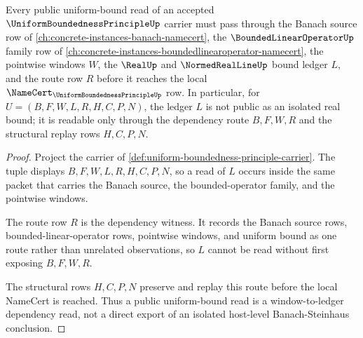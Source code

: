 \begin{theorem}
\label{thm:uniform-boundedness-principle-window-to-ledger}
Every public uniform-bound read of an accepted $\UniformBoundednessPrincipleUp$ carrier must pass through the Banach source row of \autoref{ch:concrete-instances-banach-namecert}, the $\BoundedLinearOperatorUp$ family row of \autoref{ch:concrete-instances-boundedlinearoperator-namecert}, the pointwise windows $W$, the $\RealUp$ and $\NormedRealLineUp$ bound ledger $L$, and the route row $R$ before it reaches the local $\NameCert_{\UniformBoundednessPrincipleUp}$ row. In particular, for $U=(B,F,W,L,R,H,C,P,N)$, the ledger $L$ is not public as an isolated real bound; it is readable only through the dependency route $B,F,W,R$ and the structural replay rows $H,C,P,N$.
\end{theorem}
\begin{proof}
Project the carrier of \autoref{def:uniform-boundedness-principle-carrier}. The tuple displays $B,F,W,L,R,H,C,P,N$, so a read of $L$ occurs inside the same packet that carries the Banach source, the bounded-operator family, and the pointwise windows.

The route row $R$ is the dependency witness. It records the Banach source rows, bounded-linear-operator rows, pointwise windows, and uniform bound as one route rather than unrelated observations, so $L$ cannot be read without first exposing $B,F,W,R$.

The structural rows $H,C,P,N$ preserve and replay this route before the local NameCert is reached. Thus a public uniform-bound read is a window-to-ledger dependency read, not a direct export of an isolated host-level Banach-Steinhaus conclusion.
\end{proof}

